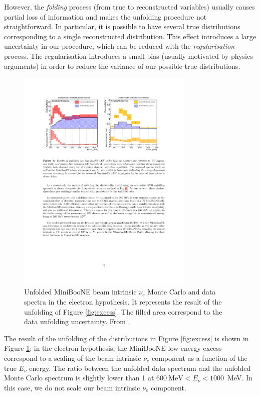 However, the \emph{folding} process (from true to reconstructed variables) usually causes partial loss of information and makes the unfolding procedure not straightforward. In particular, it is possible to have several true distributions corresponding to a single reconstructed distribution. This effect introduces a large uncertainty in our procedure, which can be reduced with the \emph{regularisation} process.
The regularisation introduces a small bias (usually motivated by physics arguments) in order to reduce the variance of our possible true distributions. 

\begin{figure}[htbp]
\centering
\includegraphics[width=0.75\textwidth]{figures/lee_result.pdf} 
\caption{Unfolded MiniBooNE beam intrinsic $\nu_e$ Monte Carlo and data spectra in the electron hypothesis. It represents the result of the unfolding of Figure \ref{fig:excess}. The filled area correspond to the data unfolding uncertainty. From \cite{lee_unfolding}.} 
\label{fig:lee_scaling}
\end{figure}

The result of the unfolding of the distributions in Figure \ref{fig:excess} is shown in Figure \ref{fig:lee_scaling}: in the electron hypothesis, the MiniBooNE low-energy excess correspond to a scaling of the beam intrinsic $\nu_e$ component as a function of the true $E_{\nu}$ energy. The ratio between the unfolded data spectrum and the unfolded Monte Carlo spectrum is slightly lower than 1 at $600~\mathrm{MeV} < E_{\nu} < 1000$~MeV. In this case, we do not scale our beam intrinsic $\nu_e$ component.

